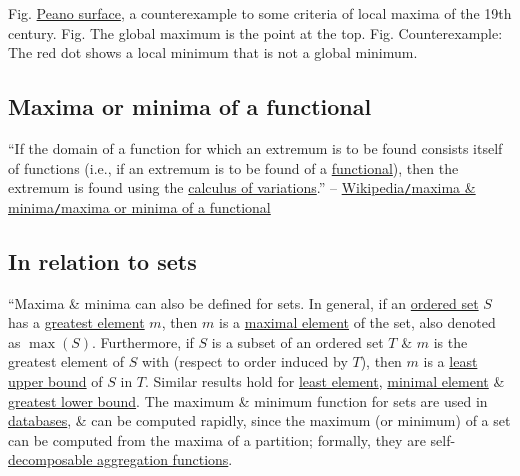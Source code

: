 \documentclass[oneside]{book}
\numberwithin{equation}{section}
\begin{document}
\textsf{Fig. \href{https://en.wikipedia.org/wiki/Peano_surface}{Peano surface}, a counterexample to some criteria of local maxima of the 19th century.} \textsf{Fig. The global maximum is the point at the top.} \textsf{Fig. Counterexample: The red dot shows a local minimum that is not a global minimum.}

\subsection{Maxima or minima of a functional}
``If the domain of a function for which an extremum is to be found consists itself of functions (i.e., if an extremum is to be found of a \href{https://en.wikipedia.org/wiki/Functional_(mathematics)}{functional}), then the extremum is found using the \href{https://en.wikipedia.org/wiki/Calculus_of_variations}{calculus of variations}.'' -- \href{https://en.wikipedia.org/wiki/Maxima_and_minima#Maxima_or_minima_of_a_functional}{Wikipedia\texttt{/}maxima \& minima\texttt{/}maxima or minima of a functional}

\subsection{In relation to sets}
``Maxima \& minima can also be defined for sets. In general, if an \href{https://en.wikipedia.org/wiki/Ordered_set}{ordered set} $S$ has a \href{https://en.wikipedia.org/wiki/Greatest_element}{greatest element} $m$, then $m$ is a \href{https://en.wikipedia.org/wiki/Maximal_element}{maximal element} of the set, also denoted as $\max(S)$. Furthermore, if $S$ is a subset of an ordered set $T$ \& $m$ is the greatest element of $S$ with (respect to order induced by $T$), then $m$ is a \href{https://en.wikipedia.org/wiki/Supremum}{least upper bound} of $S$ in $T$. Similar results hold for \href{https://en.wikipedia.org/wiki/Least_element}{least element}, \href{https://en.wikipedia.org/wiki/Minimal_element}{minimal element} \& \href{https://en.wikipedia.org/wiki/Infimum}{greatest lower bound}. The maximum \& minimum function for sets are used in \href{https://en.wikipedia.org/wiki/Database}{databases}, \& can be computed rapidly, since the maximum (or minimum) of a set can be computed from the maxima of a partition; formally, they are self-\href{https://en.wikipedia.org/wiki/Decomposable_aggregation_function}{decomposable aggregation functions}.
\end{document}
